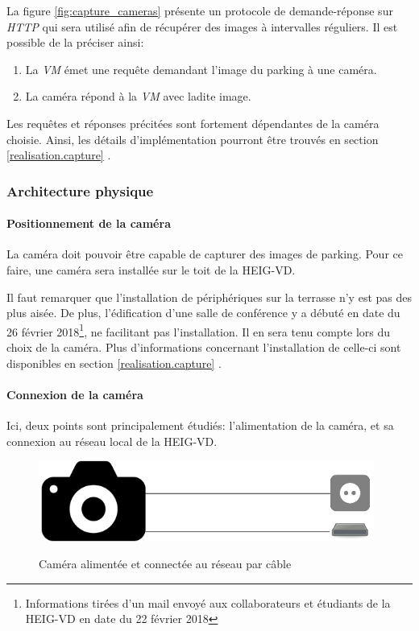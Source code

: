 La figure \ref{fig:capture_cameras} présente un protocole de demande-réponse sur \textit{HTTP} qui sera utilisé afin de récupérer des images à intervalles réguliers. Il est possible de la préciser ainsi:

\begin{enumerate}
    \item La \textit{VM} émet une requête demandant l'image du parking à une caméra. 
    \item La caméra répond à la \textit{VM} avec ladite image.
\end{enumerate}

Les requêtes et réponses précitées sont fortement dépendantes de la caméra choisie. Ainsi, les détails d'implémentation pourront être trouvés en section \ref{realisation.capture} .


\subsubsection{Architecture physique}\label{conception.architecture.camera.physique}
\paragraph{Positionnement de la caméra}\label{conception.architecture.camera.physique.position}
La caméra doit pouvoir être capable de capturer des images de parking. Pour ce faire, une caméra sera installée sur le toit de la HEIG-VD. 

Il faut remarquer que l'installation de périphériques sur la terrasse n'y est pas des plus aisée. De plus, l'édification d'une salle de conférence y a débuté en date du 26 février 2018\footnote{Informations tirées d'un mail envoyé aux collaborateurs et étudiants de la HEIG-VD en date du 22 février 2018}, ne facilitant pas l'installation. Il en sera tenu compte lors du choix de la caméra. Plus d'informations concernant l'installation de celle-ci sont disponibles en section \ref{realisation.capture} .

\paragraph{Connexion de la caméra}

Ici, deux points sont principalement étudiés: l'alimentation de la caméra, et sa connexion au réseau local de la HEIG-VD.  

\begin{figure}[H]
    \includegraphics[width=110mm]{img/conception/cam_con_1.png}
    \label{fig:cam_connection_1}
    \centering
    \caption{Caméra alimentée et connectée au réseau par câble}
\end{figure}

